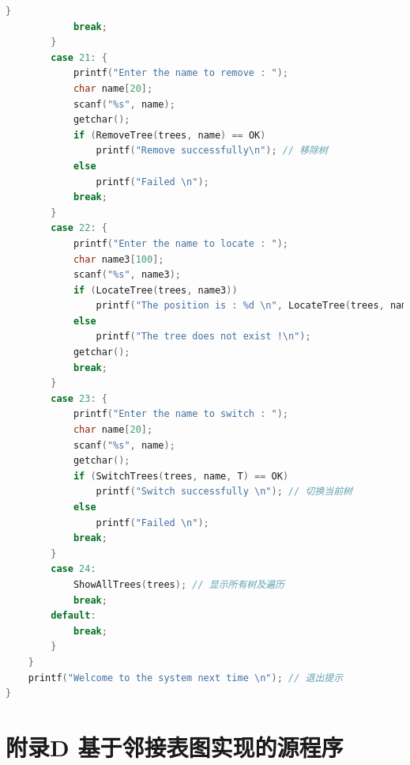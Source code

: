 \documentclass[supercite]{Experimental_Report}
\theoremstyle{definition}
\begin{document}
\begin{lstlisting}[language=c]
            }
            break;
        }
        case 21: {
            printf("Enter the name to remove : ");
            char name[20];
            scanf("%s", name);
            getchar();
            if (RemoveTree(trees, name) == OK)
                printf("Remove successfully\n"); // 移除树
            else
                printf("Failed \n");
            break;
        }
        case 22: {
            printf("Enter the name to locate : ");
            char name3[100];
            scanf("%s", name3);
            if (LocateTree(trees, name3))
                printf("The position is : %d \n", LocateTree(trees, name3)); // 查找树在集合中的位置
            else
                printf("The tree does not exist !\n");
            getchar();
            break;
        }
        case 23: {
            printf("Enter the name to switch : ");
            char name[20];
            scanf("%s", name);
            getchar();
            if (SwitchTrees(trees, name, T) == OK)
                printf("Switch successfully \n"); // 切换当前树
            else
                printf("Failed \n");
            break;
        }
        case 24:
            ShowAllTrees(trees); // 显示所有树及遍历
            break;
        default:
            break;
        }
    }
    printf("Welcome to the system next time \n"); // 退出提示
}
\end{lstlisting}

\newpage

\section{附录D 基于邻接表图实现的源程序}
\end{document}
